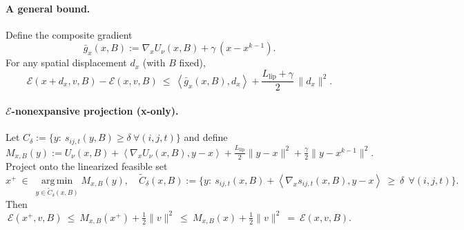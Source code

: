 \documentclass[11pt]{article}
\theoremstyle{remark}
\theoremstyle{definition}
\newcommand{\argmin}{\operatorname*{arg\,min}}
\newcommand{\inner}[2]{\left\langle #1, #2 \right\rangle}
\newcommand{\Llip}{L_{\text{lip}}}
\begin{document}
\paragraph{A general bound.}
Define the composite gradient
\begin{equation}\label{eq:gbar}
\bar g_x(x,B):=\nabla_x U_\nu(x,B)+\gamma\,(x-x^{k-1}) .
\end{equation}
For any spatial displacement $d_x$ (with $B$ fixed),
\begin{equation}\label{eq:Ebound-generic}
\mathcal{E}(x+d_x,v,B)-\mathcal{E}(x,v,B)
\ \le\ \inner{\bar g_x(x,B)}{d_x}
+\frac{\Llip+\gamma}{2}\,\|d_x\|^2 .
\end{equation}

\paragraph{\(\mathcal{E}\)-nonexpansive projection (x-only).}
Let $C_\delta:=\{y:\ s_{ij,t}(y,B)\ge\delta\ \forall(i,j,t)\}$ and define
\[
M_{x,B}(y):=U_\nu(x,B)+\inner{\nabla_x U_\nu(x,B)}{y-x}+\tfrac{\Llip}{2}\|y-x\|^2+\tfrac{\gamma}{2}\|y-x^{k-1}\|^2 .
\]
Project onto the linearized feasible set
\begin{equation}\label{eq:E-proj}
x^{+}\ \in\ \argmin_{y\in \tilde C_\delta(x,B)} M_{x,B}(y),\quad
\tilde C_\delta(x,B):=\bigl\{y:\ s_{ij,t}(x,B)+\inner{\nabla_x s_{ij,t}(x,B)}{y-x}\ \ge\ \delta\ \ \forall(i,j,t)\bigr\}.
\end{equation}
Then
\begin{equation}\label{eq:nonexpansive}
\mathcal{E}(x^{+},v,B)\ \le\ M_{x,B}(x^{+})+\tfrac12\|v\|^2\ \le\ M_{x,B}(x)+\tfrac12\|v\|^2\ =\ \mathcal{E}(x,v,B).
\end{equation}
\end{document}
